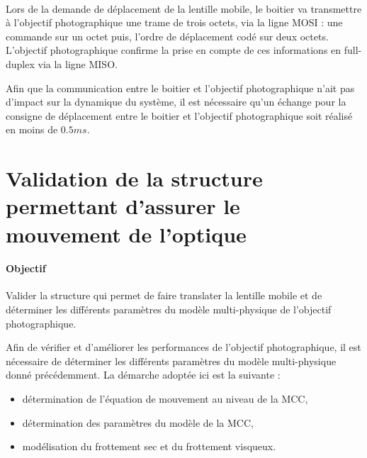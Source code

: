 

~\

Lors de la demande de déplacement de la lentille mobile, le boitier va transmettre à l'objectif photographique une trame de trois octets, via la ligne MOSI : une commande sur un octet puis, l'ordre de déplacement codé sur deux octets. L'objectif photographique confirme la prise en compte de ces informations en full-duplex via la ligne MISO.

Afin que la communication entre le boitier et l'objectif photographique n'ait pas d'impact sur la dynamique du système, il est nécessaire qu'un échange pour la consigne de déplacement entre le boitier et l'objectif photographique soit réalisé en moins de $0.5ms$.


\section{Validation de la structure permettant d'assurer le mouvement
de l'optique}

\paragraph{Objectif}

Valider la structure qui permet de faire translater la lentille mobile et de déterminer les différents paramètres du modèle multi-physique de l'objectif photographique.

Afin de vérifier et d'améliorer les performances de l'objectif photographique, il est nécessaire de déterminer les différents paramètres du modèle multi-physique donné précédemment. La démarche adoptée ici est la suivante :
\begin{itemize}
 \item détermination de l'équation de mouvement au niveau de la MCC,
 \item détermination des paramètres du modèle de la MCC,
 \item modélisation du frottement sec et du frottement visqueux.
\end{itemize}

